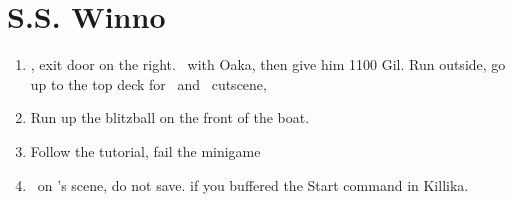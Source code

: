 \chapter{S.S. Winno}
\begin{enumerate}
	\item \cs[1:10], exit door on the right. \sd\ with Oaka, then give him 1100 Gil. Run outside, go up to the top deck for \wakka\ and \lulu\ cutscene, \sd
	\item Run up the blitzball on the front of the boat. \cs[1:10]
	\item Follow the tutorial, fail the minigame
	\item \sd\ on \yuna's scene, do not save. \skippablefmv[0:30] if you buffered the Start command in Killika.
\end{enumerate}